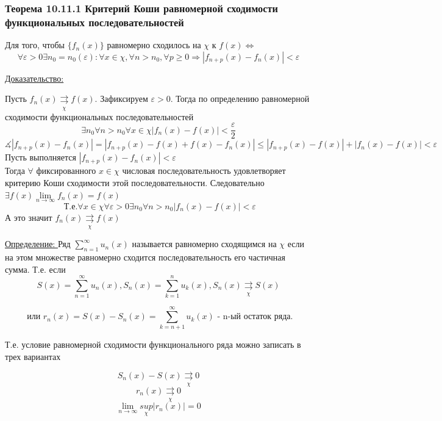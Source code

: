 \documentclass[12pt]{article}
\newcommand*\circled[1]{\tikz[baseline=(char.base)]{
    \node[shape=circle, draw, inner sep=1pt, 
        minimum height=12pt] (char) {#1};}}
\let\oldsum\sum
\let\oldlim\lim
\renewcommand{\sum}{\oldsum\limits}
\renewcommand{\lim}{\oldlim\limits}
\begin{document}
  \subsubsection*{Теорема 10.11.1 Критерий Коши равномерной сходимости функциональных последовательностей}\label{th:10.11.1}
  \par\noindent
  Для того, чтобы $\{f_n(x)\}$ равномерно сходилось на $\chi$ к $f(x) \Leftrightarrow$
  \[\forall \varepsilon > 0 \exists n_0=n_0(\varepsilon): \forall x \in \chi, \forall n > n_0, \forall p \geq 0 \Rightarrow |f_{n+p}(x)-f_n(x)|< \varepsilon\]

  \underline{Доказательство:}
  \begin{adjustwidth}{1.5em}{1.5em}
    \circled{$\Rightarrow$} Пусть $f_n(x) \underset{\chi}{\rightrightarrows} f(x).$ Зафиксируем $\varepsilon>0$. Тогда
    по определению равномерной сходимости функциональных последовательностей
    \[\exists n_0 \forall n>n_0 \forall x \in \chi |f_n(x)-f(x)|<\frac{\varepsilon}{2}\]
    \[\measuredangle  |f_{n+p}(x)-f_n(x)| = |f_{n+p}(x)-f(x)+f(x)-f_n(x)|\leq |f_{n+p}(x)-f(x)|+|f_n(x)-f(x)| < \varepsilon\]
    \circled{$\Leftarrow$} Пусть выполняется $|f_{n+p}(x)-f_n(x)|<\varepsilon$\\
    Тогда $\forall$ фиксированного $x \in \chi$ числовая последовательность удовлетворяет критерию Коши сходимости
    этой последовательности. Следовательно $\exists f(x) \lim_{n \to \infty}f_n(x)=f(x)$\\
    \[\text{ Т.е.} \forall x \in \chi \forall \varepsilon > 0 \exists n_0 \forall n>n_0 |f_n(x)-f(x)|<\varepsilon\]
    А это значит $f_n(x) \underset{\chi}{\rightrightarrows} f(x)$
  \end{adjustwidth}

  \underline{Определение: } Ряд $\sum_{n=1}^{\infty} u_n(x)$ называется равномерно сходящимся на $\chi$ если на этом
  множестве равномерно сходится последовательность его частичная сумма. Т.е. если 
  \[S(x)=\sum_{n=1}^{\infty}u_n(x),S_n(x)=\sum_{k=1}^{n}u_k(x), S_n(x)\underset{\chi}{\rightrightarrows} S(x)\]

  \[\text{ или } r_n(x)=S(x)-S_n(x)=\sum_{k=n+1}^{\infty}u_k(x) \text{ - n-ый остаток ряда.}\]
  
  Т.е. условие равномерной сходимости функционального ряда можно записать в трех вариантах

  \[S_n(x)-S(x) \underset{\chi}{\rightrightarrows}0\]
  \[r_n(x)\underset{\chi}{\rightrightarrows} 0\]
  \[\lim_{n \to \infty} \underset{\chi}{sup}|r_n(x)|=0\]
\end{document}
